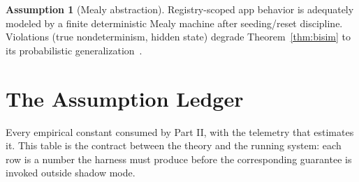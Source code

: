 \documentclass[11pt]{article}
\theoremstyle{plain}
\theoremstyle{definition}
\newtheorem{assumption}[theorem]{Assumption}
\theoremstyle{remark}
\begin{document}
\begin{assumption}[Mealy abstraction]\label{asm:mealy}
Registry-scoped app behavior is adequately modeled by a finite deterministic
Mealy machine after seeding/reset discipline. Violations (true
nondeterminism, hidden state) degrade Theorem~\ref{thm:bisim} to its
probabilistic generalization~\cite{ot-bisim}.
\end{assumption}

\section{The Assumption Ledger}\label{sec:ledger}

Every empirical constant consumed by Part II, with the telemetry that
estimates it. This table is the contract between the theory and the running
system: each row is a number the harness must produce before the
corresponding guarantee is invoked outside shadow mode.
\end{document}
